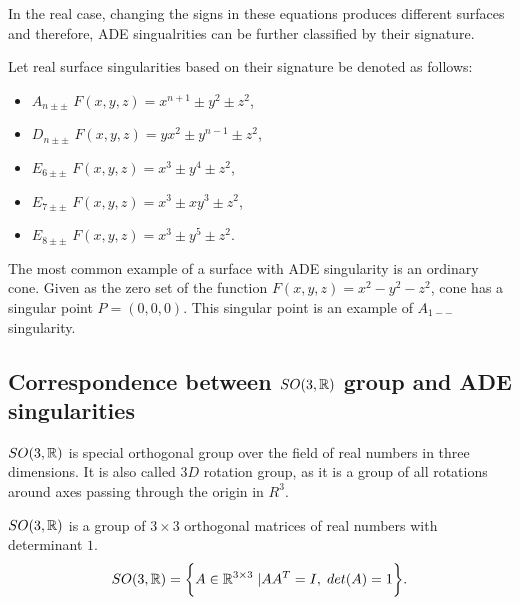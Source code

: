 In the real case, changing the signs in these equations produces different
surfaces and therefore, ADE singualrities can be further classified by their
signature.

\begin{definition}
    Let real surface singularities based on their signature be denoted as follows:
    \begin{itemize}
        \item $A_{n\pm\pm}$ \hspace{5mm} $F(x,y,z)=x^{n+1}\pm y^2\pm z^2$,
              
        \item $D_{n\pm\pm}$ \hspace{5mm} $F(x,y,z)=yx^2\pm y^{n-1}\pm z^2$,
        
        \item $E_{6\pm\pm}$ \hspace{5mm} $F(x,y,z)=x^3\pm y^4\pm z^2$,
        
        \item $E_{7\pm\pm}$ \hspace{5mm} $F(x,y,z)=x^3\pm xy^3\pm z^2$,
        
        \item $E_{8\pm\pm}$ \hspace{5mm} $F(x,y,z)=x^3\pm y^5\pm z^2$.
        \end{itemize}
\end{definition}

The most common example of a surface with ADE singularity is an ordinary cone.
Given as the zero set of the function $F(x, y, z)=x^2-y^2-z^2$, cone has
a singular point $P=(0, 0, 0)$. This singular point is an example of $A_{1--}$
singularity.

\subsection*{Correspondence between $SO(3,\mathbb{R})$ group and ADE singularities}
\label{subs2.2.2}
$SO(3, \mathbb{R})$ is special orthogonal group over the field of real numbers 
in three dimensions. It is also called $3D$ rotation group, as it is a group
of all rotations around axes passing through the origin in $R^3$.
\begin{definition}
    $SO(3, \mathbb{R})$ is a group of $3\times3$ orthogonal matrices
    of real numbers with determinant $1$.
    $$SO(3, \mathbb{R}) = \bigg\{A\in\mathbb{R}^{3\times3} \hspace{1mm} | AA^T=I ,\hspace{1mm} det(A)=1\bigg\}.$$
\end{definition}

